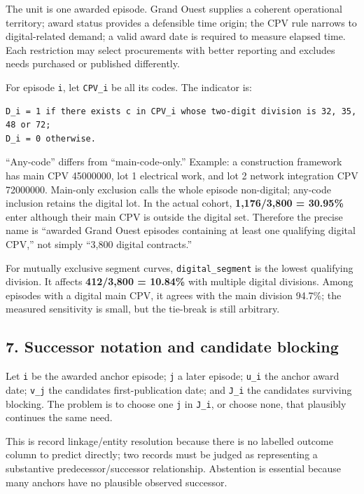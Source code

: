 The unit is one awarded episode. Grand Ouest supplies a coherent
operational territory; award status provides a defensible time origin;
the CPV rule narrows to digital-related demand; a valid award date is
required to measure elapsed time. Each restriction may select
procurements with better reporting and excludes needs purchased or
published differently.

For episode \texttt{i}, let \texttt{CPV\_i} be all its codes. The
indicator is:

\begin{verbatim}
D_i = 1 if there exists c in CPV_i whose two-digit division is 32, 35, 48 or 72;
D_i = 0 otherwise.
\end{verbatim}

``Any-code'' differs from ``main-code-only.'' Example: a construction
framework has main CPV 45000000, lot 1 electrical work, and lot 2
network integration CPV 72000000. Main-only exclusion calls the whole
episode non-digital; any-code inclusion retains the digital lot. In the
actual cohort, \textbf{1,176/3,800 = 30.95\%} enter although their main
CPV is outside the digital set. Therefore the precise name is ``awarded
Grand Ouest episodes containing at least one qualifying digital CPV,''
not simply ``3,800 digital contracts.''

For mutually exclusive segment curves, \texttt{digital\_segment} is the
lowest qualifying division. It affects \textbf{412/3,800 = 10.84\%} with
multiple digital divisions. Among episodes with a digital main CPV, it
agrees with the main division 94.7\%; the measured sensitivity is small,
but the tie-break is still arbitrary.

\subsection{7. Successor notation and candidate
blocking}\label{7-successor-notation-and-candidate-blocking}

Let \texttt{i} be the awarded anchor episode; \texttt{j} a later
episode; \texttt{u\_i} the anchor award date; \texttt{v\_j} the
candidate\textquotesingle s first-publication date; and \texttt{J\_i}
the candidates surviving blocking. The problem is to choose one
\texttt{j} in \texttt{J\_i}, or choose none, that plausibly continues
the same need.

This is record linkage/entity resolution because there is no labelled
outcome column to predict directly; two records must be judged as
representing a substantive predecessor/successor relationship.
Abstention is essential because many anchors have no plausible observed
successor.

